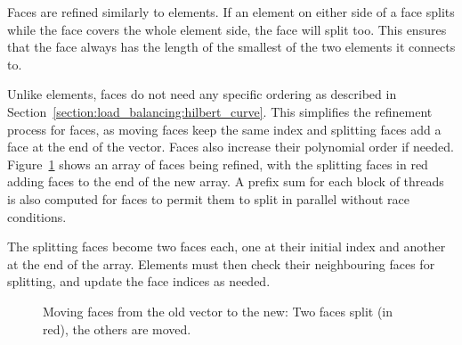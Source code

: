 Faces are refined similarly to elements. If an element on either side of a face splits while the
face covers the whole element side, the face will split too. This ensures that the face always has
the length of the smallest of the two elements it connects to. 

Unlike elements, faces do not need any specific ordering as described in
Section~\ref{section:load_balancing:hilbert_curve}. This simplifies the refinement process for
faces, as moving faces keep the same index and splitting faces add a face at the end of the vector.
Faces also increase their polynomial order if needed. Figure~\ref{fig:refinement_offset_face} shows
an array of faces being refined, with the splitting faces in red adding faces to the end of the new
array. A prefix sum for each block of threads is also computed for faces to permit them to split in
parallel without race conditions.

The splitting faces become two faces each, one at their initial index and another at the end of the
array. Elements must then check their neighbouring faces for splitting, and update the face indices
as needed.

\begin{figure}[H]
    \centering
    
    \caption{Moving faces from the old vector to the new: Two faces split (in red), the others are moved.}\label{fig:refinement_offset_face}
\end{figure}
